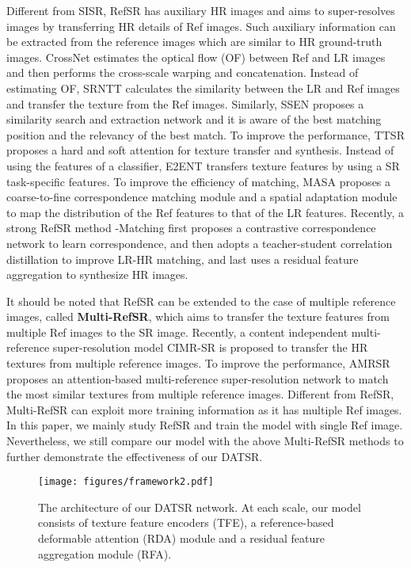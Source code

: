 \documentclass[runningheads]{llncs}
\begin{document}
Different from SISR, RefSR has auxiliary HR images and aims to super-resolves images by transferring HR details of Ref images.
Such auxiliary information can be extracted from the reference images which are similar to HR ground-truth images.
CrossNet \cite{zheng2018crossnet} estimates the optical flow (OF) between Ref and LR images and then performs the cross-scale warping and concatenation.
Instead of estimating OF, SRNTT \cite{zhang2019image} calculates the similarity between the LR and Ref images and transfer the texture from the Ref images.
Similarly, SSEN \cite{Shim_2020_CVPR} proposes a similarity search and extraction network and it is aware of the best matching position and the relevancy of the best match.
To improve the performance, TTSR \cite{yang2020learning} proposes a hard and soft attention for texture transfer and synthesis.
Instead of using the features of a classifier, E2ENT \cite{xie2020feature} transfers texture features by using a SR task-specific features. 
To improve the efficiency of matching, MASA \cite{lu2021masa} proposes a coarse-to-fine correspondence matching module and a spatial adaptation module to map the distribution of the Ref features to that of the LR features. 
Recently, a strong RefSR method -Matching \cite{jiang2021robust} first proposes a contrastive correspondence network to learn correspondence, and then adopts a teacher-student correlation distillation to improve LR-HR matching, and last uses a residual feature aggregation to synthesize HR images.

It should be noted that RefSR can be extended to the case of multiple reference images, called \textbf{Multi-RefSR}, which aims to transfer the texture features from multiple Ref images to the SR image. 
Recently, a content independent multi-reference super-resolution model CIMR-SR \cite{yantowards} is proposed to transfer the HR textures from multiple reference images.
To improve the performance, AMRSR \cite{pesavento2021attention} proposes an attention-based multi-reference super-resolution network to match the most similar textures from multiple reference images.
Different from RefSR, Multi-RefSR can exploit more training information as it has multiple Ref images.
In this paper, we mainly study RefSR and train the model with single Ref image.
Nevertheless, we still compare our model with the above Multi-RefSR methods to further demonstrate the effectiveness of our DATSR.

\begin{figure*}[t]
\setlength\belowcaptionskip{-5pt}
\centering
\texttt{[image: figures/framework2.pdf]}
\caption{The architecture of our DATSR network. At each scale, our model consists of texture feature encoders (TFE), a reference-based deformable attention (RDA) module and a residual feature aggregation module (RFA). }
\label{fig:framework}
\end{figure*}
\end{document}
